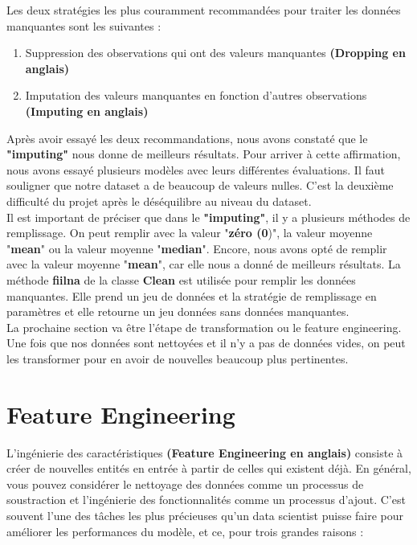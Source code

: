 \documentclass[12pt, french]{report}
\begin{document}
Les deux stratégies les plus couramment recommandées pour traiter les données manquantes sont les suivantes \cite{key21}:
\begin{enumerate}
\item Suppression des observations qui ont des valeurs manquantes \textbf{(Dropping en anglais)}
\item Imputation des valeurs manquantes en fonction d'autres observations \textbf{(Imputing en anglais)}
\end{enumerate}

Après avoir essayé les deux recommandations, nous avons constaté que le \textbf{"imputing"} nous donne de meilleurs résultats. Pour arriver à cette affirmation, nous avons essayé plusieurs modèles avec leurs différentes évaluations. Il faut souligner que notre dataset a de beaucoup de valeurs nulles. C'est la deuxième difficulté du projet après le déséquilibre au niveau du dataset. \\

Il est important de préciser que dans le  \textbf{"imputing"}, il y a plusieurs méthodes de remplissage. On peut remplir avec la valeur "\textbf{zéro (0})", la valeur moyenne "\textbf{mean}" ou la valeur moyenne "\textbf{median}". Encore, nous avons opté de remplir avec la valeur moyenne "\textbf{mean}", car elle nous a donné de meilleurs résultats. La méthode \textbf{fiilna} de la classe \textbf{Clean} est utilisée pour remplir les données manquantes. Elle prend un jeu de données et la stratégie de remplissage en paramètres et elle retourne un jeu données sans données manquantes. \\

La prochaine section va être l'étape de transformation ou le feature engineering. Une fois que nos données sont nettoyées et il n'y a pas de données vides, on peut les transformer pour en avoir de nouvelles beaucoup plus pertinentes. 

\section{Feature Engineering}

L'ingénierie des caractéristiques \textbf{(Feature Engineering en anglais)} consiste à créer de nouvelles entités en entrée à partir de celles qui existent déjà. En général, vous pouvez considérer le nettoyage des données comme un processus de soustraction et l'ingénierie des fonctionnalités comme un processus d'ajout. C'est souvent l'une des tâches les plus précieuses qu'un data scientist puisse faire pour améliorer les performances du modèle, et ce, pour trois grandes raisons \cite{key22}:
\end{document}
